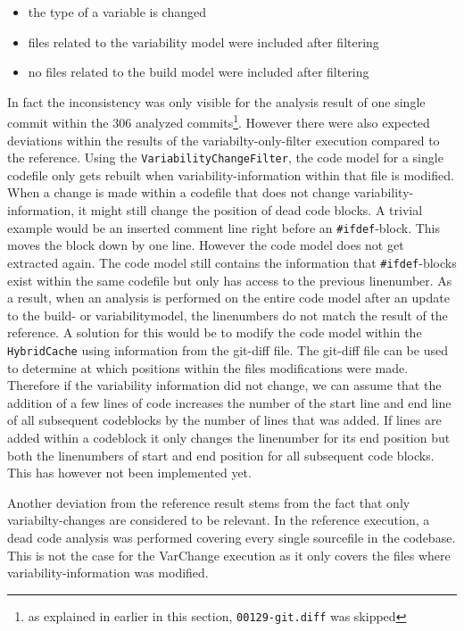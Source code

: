 \documentclass[a4paper]{article}
\begin{document}
\begin{itemize}
	\item the type of a variable is changed
	\item files related to the variability model were included after filtering
	\item no files related to the build model were included after filtering 
\end{itemize}   

In fact the inconsistency was only visible for the analysis result of one single commit within the 306 analyzed commits\footnote{as explained in earlier in this section, \texttt{00129-git.diff} was skipped}. However there were also expected deviations within the results of the variabilty-only-filter execution compared to the reference. Using the \texttt{Variability\-Change\-Filter}, the code model for a single codefile only gets rebuilt when variability-information within that file is modified. When a change is made within a codefile that does not change variability-information, it might still change the position of dead code blocks. A trivial example would be an inserted comment line right before an \texttt{\#ifdef}-block. This moves the block down by one line. However the code model does not get extracted again. The code model still contains the information that \texttt{\#ifdef}-blocks exist within the same codefile but only has access to the previous linenumber. As a result, when an analysis is performed on the entire code model after an update to the build- or variabilitymodel, the linenumbers do not match the result of the reference. A solution for this would be to modify the code model within the \texttt{Hybrid\-Cache} using information from the git-diff file. The git-diff file can be used to determine at which positions within the files modifications were made. Therefore if the variability information did not change, we can assume that the addition of a few lines of code increases the number of the start line and end line of all subsequent codeblocks by the number of lines that was added. If lines are added within a codeblock it only changes the linenumber for its end position but both the linenumbers of start and end position for all subsequent code blocks. This has however not been implemented yet.

Another deviation from the reference result stems from the fact that only variabilty-changes are considered to be relevant. In the reference execution, a dead code analysis was performed covering every single sourcefile in the codebase. This is not the case for the VarChange execution as it only covers the files where variability-information was modified.
\end{document}
